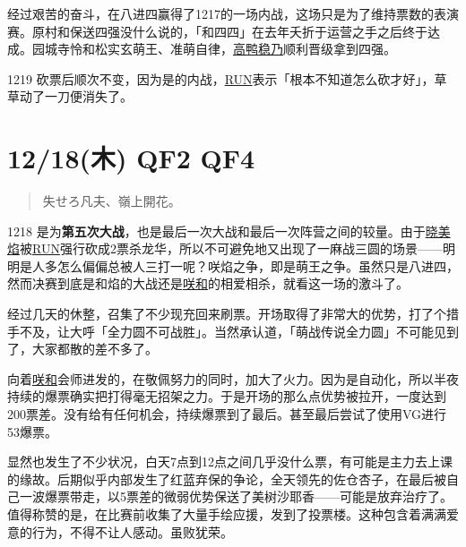 经过艰苦的奋斗，在八进四赢得了1217的一场内战，这场只是为了维持票数的表演赛。原村和保送四强没什么说的，「和四四」在去年夭折于运营之手之后终于达成。园城寺怜和松实玄萌王、准萌自律，\uline{高鸭稳乃}顺利晋级拿到四强。

1219 砍票后顺次不变，因为是的内战，\uline{RUN}表示「根本不知道怎么砍才好」，草草动了一刀便消失了。

\section{12/18(木) QF2 QF4}

\begin{quote}\kasho
失せろ凡夫、嶺上開花。
\end{quote}



1218 是为\textbf{第五次大战}，也是最后一次大战和最后一次阵营之间的较量。由于\uline{晓美焰}被\uline{RUN}强行砍成2票杀龙华，所以不可避免地又出现了一麻战三圆的场景——明明是人多怎么偏偏总被人三打一呢？咲焰之争，即是萌王之争。虽然只是八进四，然而决赛到底是和焰的大战还是\uline{咲}\uline{和}的相爱相杀，就看这一场的激斗了。

经过几天的休整，召集了不少现充回来刷票。开场取得了非常大的优势，打了个措手不及，让大呼「全力圆不可战胜」。当然承认道，「萌战传说全力圆」不可能见到了，大家都散的差不多了。

向着\uline{咲}\uline{和}会师进发的，在敬佩努力的同时，加大了火力。因为是自动化，所以半夜持续的爆票确实把打得毫无招架之力。于是开场的那么点优势被拉开，一度达到200票差。没有给有任何机会，持续爆票到了最后。甚至最后尝试了使用VG进行53爆票。

显然也发生了不少状况，白天7点到12点之间几乎没什么票，有可能是主力去上课的缘故。后期似乎内部发生了红蓝弃保的争论，全天领先的佐仓杏子，在最后被自己一波爆票带走，以5票差的微弱优势保送了美树沙耶香——可能是放弃治疗了。值得称赞的是，在比赛前收集了大量手绘应援，发到了投票楼。这种包含着满满爱意的行为，不得不让人感动。虽败犹荣。

